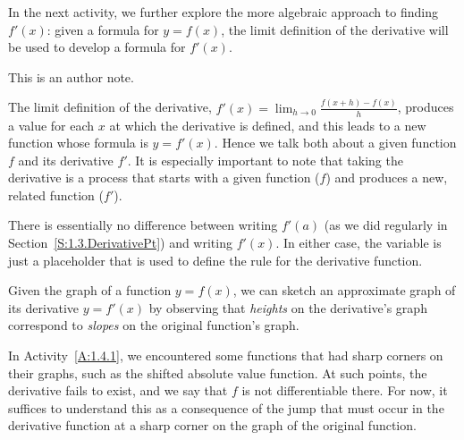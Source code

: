 In the next activity, we further explore the more algebraic approach to finding $f'(x)$:  given a formula for $y = f(x)$, the limit definition of the derivative will be used to develop a formula for $f'(x)$.  



\begin{authornote}
This is an author note.
\end{authornote}


\begin{summary}
\item The limit definition of the derivative, $f'(x) = \lim_{h \to 0} \frac{f(x+h)-f(x)}{h}$, produces a value for each $x$ at which the derivative is defined, and this leads to a new function whose formula is $y = f'(x)$.  Hence we talk both about a given function $f$ and its derivative $f'$.  It is especially important to note that taking the derivative is a process that starts with a given function ($f$) and produces a new, related function ($f'$).
\item There is essentially no difference between writing $f'(a)$ (as we did regularly in Section~\ref{S:1.3.DerivativePt}) and writing $f'(x)$.  In either case, the variable is just a placeholder that is used to define the rule for the derivative function.
\item Given the graph of a function $y = f(x)$, we can sketch an approximate graph of its derivative $y = f'(x)$ by observing that \emph{heights} on the derivative's graph correspond to \emph{slopes} on the original function's graph.
\item In Activity~\ref{A:1.4.1}, we encountered some functions that had sharp corners on their graphs, such as the shifted absolute value function.  At such points, the derivative fails to exist, and we say that $f$ is not differentiable there.  For now, it suffices to understand this as a consequence of the jump that must occur in the derivative function at a sharp corner on the graph of the original function.  
\end{summary}

\nin \hrulefill

 

\clearpage
